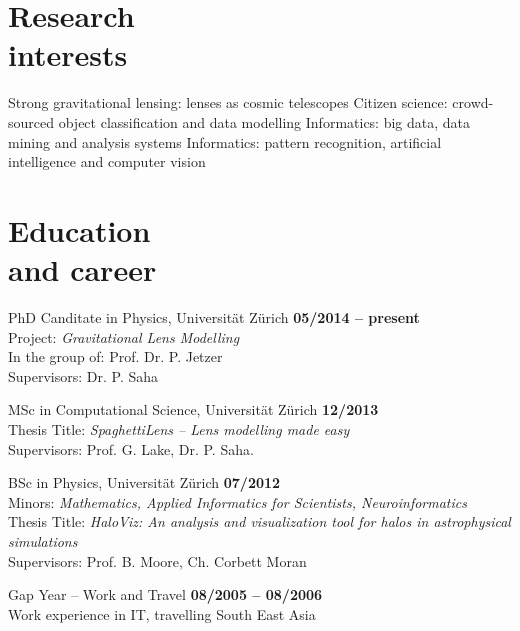 \documentclass[margin,line]{resume}
\def\tb{\textbullet\;}
\begin{document}
\begin{resume}
\section{\mysidestyle Research\\interests}

  \tb Strong gravitational lensing: lenses as cosmic telescopes
  \tb Citizen science: crowd-sourced object classification and data modelling
  \tb Informatics: big data, data mining and analysis systems
  \tb Informatics: pattern recognition, artificial intelligence and computer vision


\section{\mysidestyle Education\\ and career}

\begin{list2}

  \item  PhD Canditate in Physics, Universität Zürich
  \hfill {\bf 05/2014 -- present}\\
  {\small Project: \emph{Gravitational Lens Modelling}\\
  In the group of: Prof. Dr. P. Jetzer\\
  Supervisors: Dr. P. Saha}

  \item MSc in Computational Science, Universität Zürich
  \hfill {\bf 12/2013}\\
  {\small Thesis Title: \emph{SpaghettiLens -- Lens modelling made easy} \\
  Supervisors: Prof. G. Lake, Dr. P. Saha}.

  \item BSc in Physics, Universität Zürich
  \hfill {\bf 07/2012}\\
  {\small Minors: \emph{Mathematics, Applied Informatics for Scientists, Neuroinformatics}\\
  Thesis Title: \emph{HaloViz: An analysis and visualization tool for halos in astrophysical simulations} \\
  Supervisors: Prof. B. Moore, Ch. Corbett Moran}

  \item Gap Year -- Work and Travel
  \hfill {\bf 08/2005 -- 08/2006}\\
  {\small Work experience in IT, travelling South East Asia}



\end{list2}
\end{resume}
\end{document}
